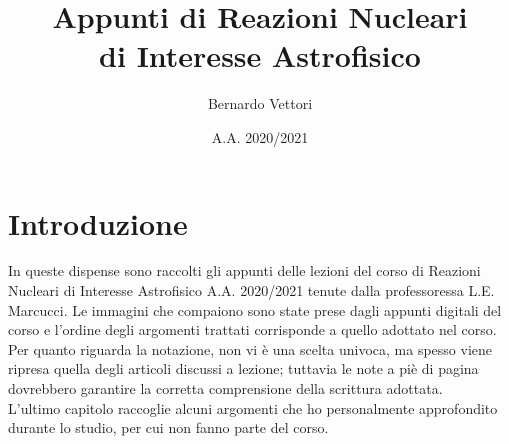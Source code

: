 \documentclass[12pt,a4paper,titlepage,openany]{book}
\title{Appunti di Reazioni Nucleari\\di Interesse Astrofisico}
\author{Bernardo Vettori}
\date{A.A. 2020/2021}
\newcommand\blankpage{
    \null
    \thispagestyle{empty}
    \addtocounter{page}{-1}
    \newpage
    }
\begin{document}
\frontmatter
\maketitle
\chapter*{Introduzione}
\noindent In queste dispense sono raccolti gli appunti delle lezioni del corso di Reazioni Nucleari di Interesse Astrofisico A.A. 2020/2021 tenute dalla professoressa L.E. Marcucci. Le immagini che compaiono sono state prese dagli appunti digitali del corso e l'ordine degli argomenti trattati corrisponde a quello adottato nel corso.\\
Per quanto riguarda la notazione, non vi è una scelta univoca, ma spesso viene ripresa quella degli articoli discussi a lezione; tuttavia le note a piè di pagina dovrebbero garantire la corretta comprensione della scrittura adottata.\\
L'ultimo capitolo \textit{} raccoglie alcuni argomenti che ho personalmente approfondito durante lo studio, per cui non fanno parte del corso.
\newpage
\tableofcontents
\mainmatter




\afterpage{\blankpage}
\printindex
\end{document}
